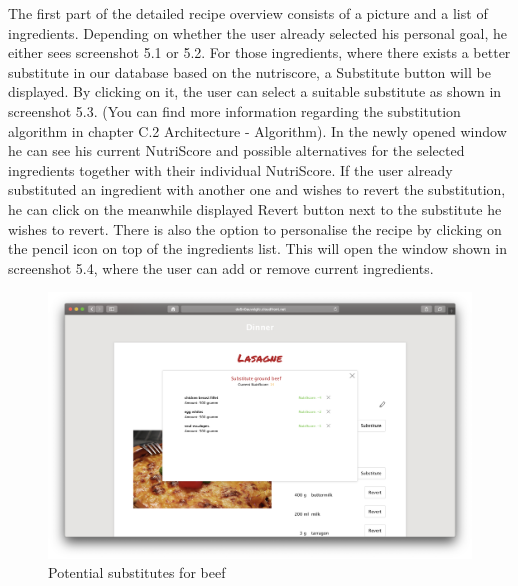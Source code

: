 The first part of the detailed recipe overview consists of a picture and a list of ingredients. Depending on whether the user already selected his personal goal, he either sees screenshot 5.1 or 5.2. For those ingredients, where there exists a better substitute in our database based on the nutriscore, a Substitute button will be displayed. By clicking on it, the user can select a suitable substitute as shown in screenshot 5.3. (You can find more information regarding the substitution algorithm in chapter C.2 Architecture - Algorithm). In the newly opened window he can see his current NutriScore and possible alternatives for the selected ingredients together with their individual NutriScore. If the user already substituted an ingredient with another one and wishes to revert the substitution, he can click on the meanwhile displayed Revert button next to the substitute he wishes to revert. 
There is also the option to personalise the recipe by clicking on the pencil icon on top of the ingredients list. This will open the window shown in screenshot 5.4, where the user can add or remove current ingredients.

\vspace{-2em}
\begin{figure}[H]
	\captionsetup{justification=centering}
	\begin{center}
		\includegraphics[scale=0.25]{Ressourcen/img/screenshots/screenshotJ.png}
		\vspace{-3em}
		\caption{Potential substitutes for beef}
	\end{center}
\end{figure}

